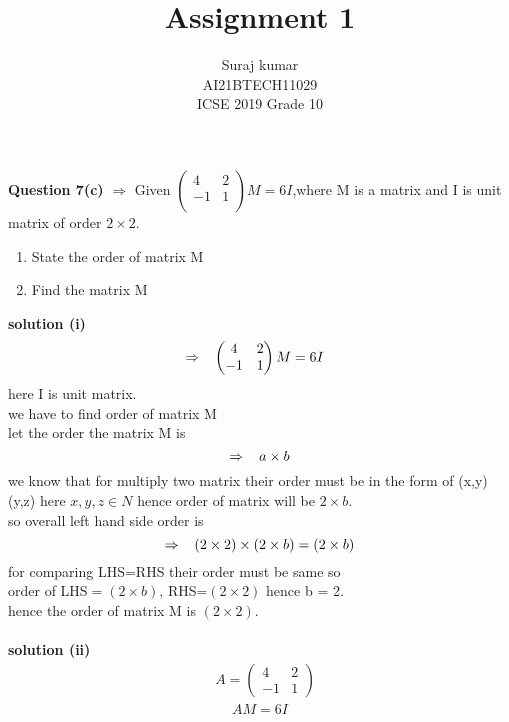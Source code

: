 \documentclass[journal,12pt,twocolumn]{IEEEtran}
\title{Assignment 1}
\author{Suraj kumar \\ \normalsize AI21BTECH11029\\\vspace*{20pt} \Large ICSE 2019 Grade 10}
\newcommand{\myvec}[1]{\ensuremath{\begin{pmatrix}#1\end{pmatrix}}}
\begin{document}
\maketitle

\textbf{Question 7(c)} $\Rightarrow$ Given $\myvec{
     4 & 2 \\
     -1 & 1 \\
      }M=6I $,where M is a matrix and I is unit matrix of order $2\times 2.$
		\begin{enumerate}[label=(\roman*)]
		\item State the order of matrix M
		\item Find the matrix M
	\end{enumerate}	
	
 \textbf{solution (i) } 
 \begin{align}
	 &\Rightarrow  \hspace{3mm} \myvec{
     4 & 2 \\
     -1 & 1 
      }M=6I
 \end{align}
    here I is unit matrix.\\
    we have to find order of matrix M\\
    let the order the matrix M is  $$ \Rightarrow \hspace{3mm} a\times b$$
      we know that for multiply two matrix their order must be in the form of  (x,y) (y,z)  here $x,y,z \in N$
      hence order of matrix will be $2\times b$.\\
      so overall left hand side order is  $$\Rightarrow \hspace{3mm} (2\times 2)\times(2\times b) =(2\times b)$$
      for comparing LHS=RHS their order must be same so \\
      order of LHS$=(2\times b)$,
      RHS=$(2\times 2)$  hence b = 2.\\
      hence the order of matrix M is $(2\times 2).$\\\\
\textbf{solution (ii)}\\
  \begin{align}
 &A=\myvec{
      4 & 2\\
      -1 & 1
     }
\end{align}
 \begin{align}
 AM=6I
 \end{align}
 
\end{document}
